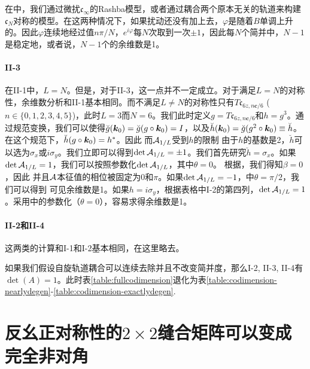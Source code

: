 在中，我们通过微扰$\mathfrak{c}_\infty$的Rashba模型，或者通过耦合两个原本无关的轨道来构建$\mathfrak{c}_N$对称的模型。在这两种情况下，如果扰动还没有加上去，$\varphi$是随着$B$单调上升的。因此$\varphi$连续地经过值$n\pi/N$，$e^{i\varphi}$每$N$次取到一次$\pm 1$，因此每$N$个简并中，$N-1$是稳定地，或者说，$N-1$个的余维数是1。

\paragraph*{II-3} 在II-1中，$L=N$。但是，对于II-3，这一点并不一定成立。对于满足$L=N$的对称性，余维数分析和II-1基本相同。而不满足$L\ne N$的对称性只有$T\mathfrak{c}_{6z,n\boldsymbol{c}/6}$ ($n\in\{0,1,2,3,4,5\}$)，此时$L=3$而$N=6$。我们此时定义$g=T\mathfrak{c}_{6z,n\boldsymbol{c}/6}$和$h=g^3$。通过规范变换，我们可以使得$\breve{g}(\boldsymbol{k}_0)=\breve{g}(g\circ\boldsymbol{k}_0)=I$，以及$\breve{h}(\boldsymbol{k}_0)=\breve{g}(g^2\circ \boldsymbol{k}_0)\equiv\breve{h}$。在这个规范下，$\breve{h}(g\circ\boldsymbol{k}_0)=h^*$。因此
而${\cal A}_{1/L}$受到$h$的限制 
由于$h$的基数是2，$\breve{h}$可以选为$\sigma_x$或$i\sigma_y$。我们立即可以得到$\det {\cal A}_{1/L} = \pm 1$。我们首先研究$\breve{h}=\sigma_x$。如果$\det {\cal A}_{1/L} = 1$，我们可以按照参数化$\det {\cal A}_{1/L}$，其中$\theta=0$。 根据，我们得知$\beta=0$，因此 
并且${\cal A}$本征值的相位被固定为$0$和$\pi$。如果$\det{{\cal A}_{1/L}}=-1$，中$\theta=\pi/2$，我们可以得到
可见余维数是1。如果$h=i\sigma_y$，根据表格中I-2的第四列，$\det {\cal A}_{1/L}=1$。采用中的参数化（$\theta=0$），容易求得余维数是1。

\paragraph*{II-2和II-4} 这两类的计算和I-1和I-2基本相同，在这里略去。

如果我们假设自旋轨道耦合可以连续去除并且不改变简并度，那么I-2, II-3, II-4有$\det(A)=1$。此时表\ref{table:fullcodimension}退化为表\ref{table:codimension-nearlydegen}-\ref{table:codimension-exactlydegen}.

\section{反幺正对称性的$2\times 2$缝合矩阵可以变成完全非对角\label{app:makinggoffdiagonal}}

